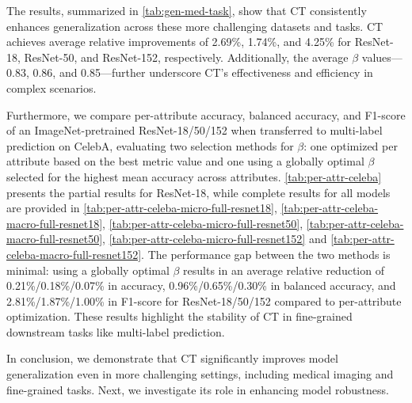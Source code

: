 The results, summarized in \cref{tab:gen-med-task}, show that CT consistently enhances generalization across these more challenging datasets and tasks. CT achieves average relative improvements of 2.69\%, 1.74\%, and 4.25\% for ResNet-18, ResNet-50, and ResNet-152, respectively. Additionally, the average $\beta$ values—0.83, 0.86, and 0.85—further underscore CT’s effectiveness and efficiency in complex scenarios.

Furthermore, we compare per-attribute accuracy, balanced accuracy, and F1-score of an ImageNet-pretrained ResNet-18/50/152 when transferred to multi-label prediction on CelebA, evaluating two selection methods for $\beta$: one optimized per attribute based on the best metric value and one using a globally optimal $\beta$ selected for the highest mean accuracy across attributes. \cref{tab:per-attr-celeba} presents the partial results for ResNet-18, while complete results for all models are provided in \cref{tab:per-attr-celeba-micro-full-resnet18}, \cref{tab:per-attr-celeba-macro-full-resnet18}, \cref{tab:per-attr-celeba-micro-full-resnet50}, \cref{tab:per-attr-celeba-macro-full-resnet50}, \cref{tab:per-attr-celeba-micro-full-resnet152} and \cref{tab:per-attr-celeba-macro-full-resnet152}. The performance gap between the two methods is minimal: using a globally optimal $\beta$ results in an average relative reduction of 0.21\%/0.18\%/0.07\% in accuracy, 0.96\%/0.65\%/0.30\% in balanced accuracy, and 2.81\%/1.87\%/1.00\% in F1-score for ResNet-18/50/152 compared to per-attribute optimization. These results highlight the stability of CT in fine-grained downstream tasks like multi-label prediction.

In conclusion, we demonstrate that CT significantly improves model generalization even in more challenging settings, including medical imaging and fine-grained tasks. Next, we investigate its role in enhancing model robustness.

